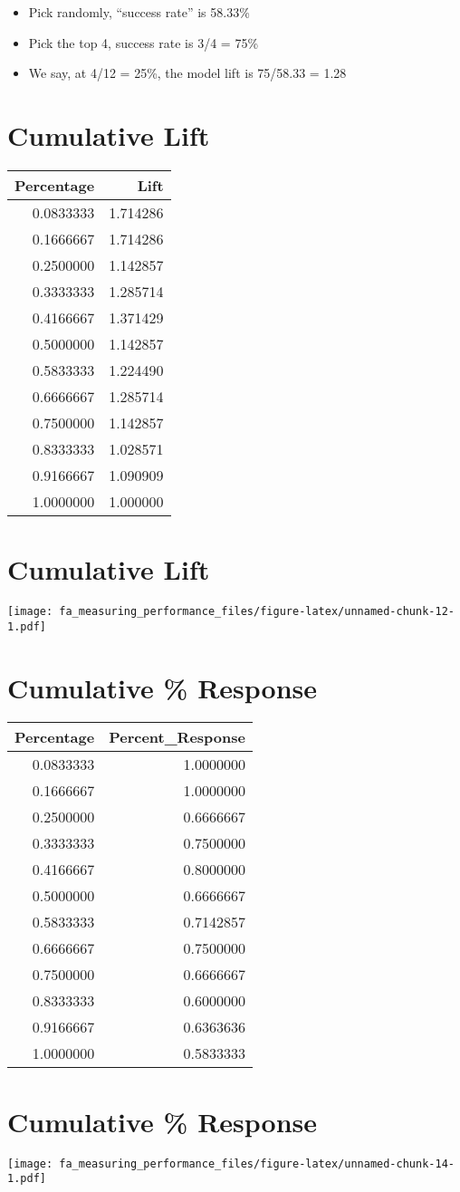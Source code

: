 \documentclass[
]{article}
\providecommand{\tightlist}{%
  \setlength{\itemsep}{0pt}\setlength{\parskip}{0pt}}
\begin{document}
\begin{itemize}
\tightlist
\item
  Pick randomly, ``success rate'' is 58.33\%
\item
  Pick the top 4, success rate is 3/4 = 75\%
\item
  We say, at 4/12 = 25\%, the model lift is 75/58.33 = 1.28
\end{itemize}

\hypertarget{cumulative-lift-7}{%
\section{Cumulative Lift}\label{cumulative-lift-7}}

\begin{longtable}[]{@{}rr@{}}
\toprule
Percentage & Lift\tabularnewline
\midrule
\endhead
0.0833333 & 1.714286\tabularnewline
0.1666667 & 1.714286\tabularnewline
0.2500000 & 1.142857\tabularnewline
0.3333333 & 1.285714\tabularnewline
0.4166667 & 1.371429\tabularnewline
0.5000000 & 1.142857\tabularnewline
0.5833333 & 1.224490\tabularnewline
0.6666667 & 1.285714\tabularnewline
0.7500000 & 1.142857\tabularnewline
0.8333333 & 1.028571\tabularnewline
0.9166667 & 1.090909\tabularnewline
1.0000000 & 1.000000\tabularnewline
\bottomrule
\end{longtable}

\hypertarget{cumulative-lift-8}{%
\section{Cumulative Lift}\label{cumulative-lift-8}}

\texttt{[image: fa\_measuring\_performance\_files/figure-latex/unnamed-chunk-12-1.pdf]}

\hypertarget{cumulative-response}{%
\section{Cumulative \% Response}\label{cumulative-response}}

\begin{longtable}[]{@{}rr@{}}
\toprule
Percentage & Percent\_Response\tabularnewline
\midrule
\endhead
0.0833333 & 1.0000000\tabularnewline
0.1666667 & 1.0000000\tabularnewline
0.2500000 & 0.6666667\tabularnewline
0.3333333 & 0.7500000\tabularnewline
0.4166667 & 0.8000000\tabularnewline
0.5000000 & 0.6666667\tabularnewline
0.5833333 & 0.7142857\tabularnewline
0.6666667 & 0.7500000\tabularnewline
0.7500000 & 0.6666667\tabularnewline
0.8333333 & 0.6000000\tabularnewline
0.9166667 & 0.6363636\tabularnewline
1.0000000 & 0.5833333\tabularnewline
\bottomrule
\end{longtable}

\hypertarget{cumulative-response-1}{%
\section{Cumulative \% Response}\label{cumulative-response-1}}

\texttt{[image: fa\_measuring\_performance\_files/figure-latex/unnamed-chunk-14-1.pdf]}
\end{document}
